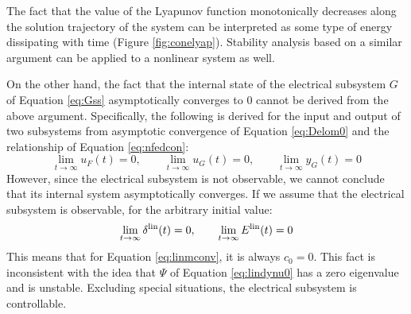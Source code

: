 \documentclass[graybox, envcountchap]{svmult}
\begin{document}
\begin{COLUMN}
The fact that the value of the Lyapunov function monotonically decreases along the solution trajectory of the system can be interpreted as some type of energy dissipating with time (Figure \ref{fig:conelyap}).
Stability analysis based on a similar argument can be applied to a nonlinear system as well.

\end{COLUMN}

On the other hand, the fact that the internal state of the electrical subsystem $G$ of Equation \ref{eq:Gss} asymptotically converges to 0 cannot be derived from the above argument.
Specifically, the following is derived for the input and output of two subsystems from asymptotic convergence of Equation \ref{eq:Delom0} and the relationship of Equation \ref{eq:nfedcon}:
\[
\lim_{t\rightarrow \infty} u_F(t)  =0,\qquad
\lim_{t\rightarrow \infty} u_G(t)  =0,\qquad
\lim_{t\rightarrow \infty} y_G(t)  =0
\]
However, since the electrical subsystem is not observable, we cannot conclude that its internal system asymptotically converges.
If we assume that the electrical subsystem is observable, for the arbitrary initial value: 
\[
\lim_{t\rightarrow \infty}  \delta^{\rm lin}(t)  =0,\qquad
\lim_{t\rightarrow \infty}  E^{\rm lin}(t)  =0
\]
This means that for Equation \ref{eq:linmconv}, it is always $c_0=0$.
This fact is inconsistent with the idea that $\Psi$ of Equation \ref{eq:lindynu0} has a zero eigenvalue and is unstable.
Excluding special situations, the electrical subsystem is controllable.
\end{document}
